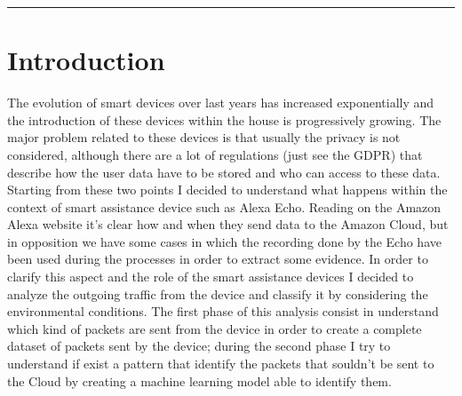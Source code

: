 \documentclass[sigconf]{acmart}
\begin{document}


    \begin{teaserfigure}
        \rule{\linewidth}{1mm}
    \end{teaserfigure}

    \maketitle


    \section{Introduction}
    The evolution of smart devices over last years has increased exponentially and the introduction of these devices within the house is progressively growing.
    The major problem related to these devices is that usually the privacy is not considered, although there are a lot of regulations (just see the GDPR) that describe how
    the user data have to be stored and who can access to these data.
    Starting from these two points I decided to understand what happens within the context of smart assistance device such as Alexa Echo.
    Reading on the Amazon Alexa website it's clear how and when they send data to the Amazon Cloud, but in opposition we have some cases in which the recording done by the Echo have been used during the processes in order to extract some evidence.
    In order to clarify this aspect and the role of the smart assistance devices I decided to analyze the outgoing traffic from the device and classify it by considering the environmental conditions.
    The first phase of this analysis consist in understand which kind of packets are sent from the device in order to create a complete dataset of packets sent by the device; during the second phase I try to understand if exist a pattern that identify the packets that souldn't be sent to the Cloud by creating a machine learning model able to identify them.
\end{document}
